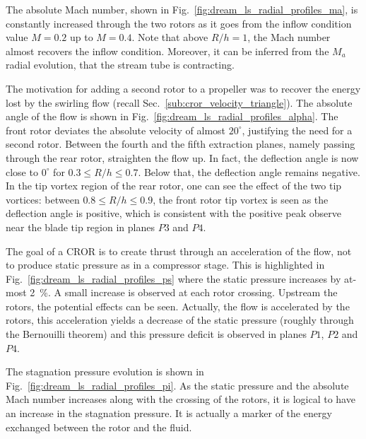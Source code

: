 The absolute Mach number, shown in 
Fig.~\ref{fig:dream_ls_radial_profiles_ma}, is constantly increased through
the two rotors as it goes from the inflow condition value $M=0.2$
up to $M=0.4$. Note that above $R/h=1$, the Mach number
almost recovers the inflow condition. Moreover, it can be inferred from the
$M_a$ radial evolution, that the stream tube is contracting.

The motivation for adding a second rotor to a propeller
was to recover the energy lost by the swirling flow
(recall Sec.~\ref{sub:cror_velocity_triangle}).
The absolute angle of the flow is shown in 
Fig.~\ref{fig:dream_ls_radial_profiles_alpha}. The front rotor
deviates the absolute velocity of almost $20^\circ$, justifying the need
for a second rotor. Between the fourth and the fifth extraction planes, namely
passing through the rear rotor, straighten the flow up. In fact,
the deflection angle is now close to $0^\circ$ for $0.3 \leq R/h \leq 0.7$.
Below that, the deflection angle remains negative. In the tip vortex region
of the rear rotor, one can see the effect of the two tip vortices: between 
$0.8 \leq R/h \leq 0.9$, the front rotor tip vortex is seen as the 
deflection angle is positive, which is consistent with the positive
peak observe near the blade tip region in planes $P3$ and $P4$.

The goal of a CROR is to create thrust through an acceleration of 
the flow, not to produce static pressure as in a compressor stage.
This is highlighted in Fig.~\ref{fig:dream_ls_radial_profiles_ps}
where the static pressure increases by at-most 2~\%. 
A small increase is observed at each
rotor crossing. Upstream the rotors, the potential effects can
be seen. Actually, the flow is accelerated by the rotors, this acceleration
yields a decrease of the static pressure 
(roughly through the Bernouilli theorem) and this pressure deficit is observed in
planes $P1$, $P2$ and $P4$.

The stagnation pressure evolution is shown in 
Fig.~\ref{fig:dream_ls_radial_profiles_pi}. As the static pressure
and the absolute Mach number increases along with the crossing of the rotors,
it is logical to have an increase in the stagnation pressure.
It is actually a marker of the energy exchanged between the rotor
and the fluid.

